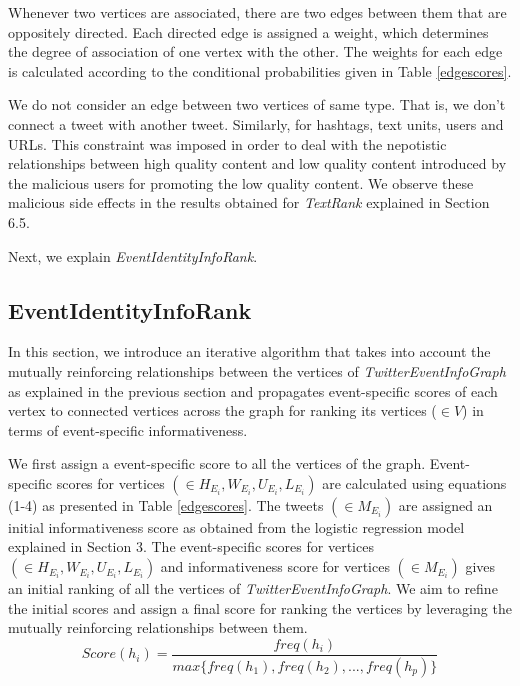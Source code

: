 Whenever two vertices are associated, there are two edges between them that are oppositely directed. Each directed edge is assigned a weight, which determines the degree of association of one vertex with the other. The weights for each edge is calculated according to the conditional probabilities given in Table \ref{edgescores}. 

We do not consider an edge between two vertices of same type. That is, we don't connect a tweet with another tweet. Similarly, for hashtags, text units, users and URLs. This constraint was imposed in order to deal with the nepotistic relationships between high quality content and low quality content introduced by the malicious users for promoting the low quality content. We observe these malicious side effects in the results obtained for \textit{TextRank} explained in Section 6.5.  

Next, we explain \textit{EventIdentityInfoRank}.


\subsection{EventIdentityInfoRank\label{eventidentityinforank}}
In this section, we introduce an iterative algorithm that takes into account the mutually reinforcing relationships between the vertices of \textit{TwitterEventInfoGraph} as explained in the previous section and propagates event-specific scores of each vertex to connected vertices across the graph for ranking its vertices ($\scriptstyle \in V$) in terms of event-specific informativeness.

We first assign a event-specific score to all the vertices of the graph. Event-specific scores for vertices $(\in H_{E_{i}}, W_{E_{i}}, U_{E_{i}}, L_{E_{i}})$ are calculated using equations (1-4) as presented in Table \ref{edgescores}. The tweets  $(\in M_{E_{i}})$ are assigned an initial informativeness score as obtained from the logistic regression model explained in Section 3. The event-specific scores for vertices $(\in H_{E_{i}}, W_{E_{i}}, U_{E_{i}}, L_{E_{i}})$ and informativeness score for vertices $(\in M_{E_{i}})$ gives an initial ranking of all the vertices of \textit{TwitterEventInfoGraph}. We aim to refine the initial scores and assign a final score for ranking the vertices by leveraging the mutually reinforcing relationships between them.
\begin{equation}
Score(h_{i}) = \frac{freq(h_{i})}{max\{freq(h_{1}),freq(h_{2}),...,freq(h_{p})\}}
\end{equation}

